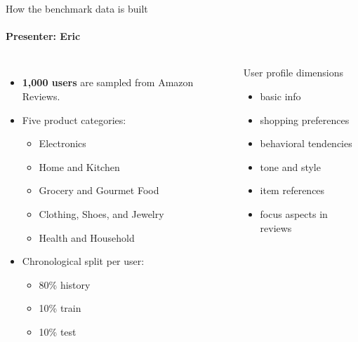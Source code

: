 \documentclass[10pt]{beamer}
\newcommand{\speaker}[1]{\framesubtitle{Presenter: #1}}
\begin{document}
\begin{frame}{How the benchmark data is built}
  \speaker{Eric}
  \begin{columns}[T,onlytextwidth]
      \begin{itemize}
        \item \textbf{1,000 users} are sampled from Amazon Reviews.
        \item Five product categories:
        \begin{itemize}
          \item Electronics
          \item Home and Kitchen
          \item Grocery and Gourmet Food
          \item Clothing, Shoes, and Jewelry
          \item Health and Household
        \end{itemize}
        \item Chronological split per user:
        \begin{itemize}
          \item 80\% history
          \item 10\% train
          \item 10\% test
        \end{itemize}
      \end{itemize}
      \begin{block}{User profile dimensions}
        \small
        \begin{itemize}
          \item basic info
          \item shopping preferences
          \item behavioral tendencies
          \item tone and style
          \item item references
          \item focus aspects in reviews
        \end{itemize}
      \end{block}
  \end{columns}
\end{frame}
\end{document}
